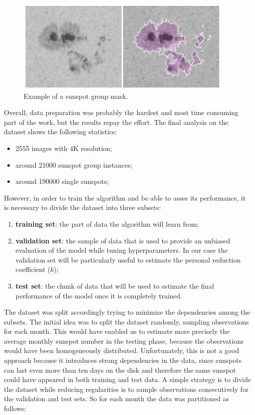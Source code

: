 \begin{figure}[t!]
    \centering
    \includegraphics[width=\textwidth]{./pictures/blanquish}
    \caption{Example of a sunspot group mask.}
    \label{fig:annotated-sunspot}
\end{figure}
Overall, data preparation was probably the hardest and most time consuming part of the work, but the results repay the effort. The final analysis on the dataset shows the following statistics:
\begin{itemize}
  \item 2555 images with 4K resolution;
  \item around 21000 sunspot group instances;
  \item around 190000 single sunspots;
\end{itemize}
However, in order to train the algorithm and be able to asses its performance, it is necessary to divide the dataset into three subsets:
\begin{enumerate}
  \item \textbf{training set}: the part of data the algorithm will learn from;
  \item \textbf{validation set}: the sample of data that is used to provide an unbiased evaluation of the model while tuning hyperparameters. In our case the validation set will be particularly useful to estimate the personal reduction coefficient ($k$);
  \item \textbf{test set}: the chunk of data that will be used to estimate the final performance of the model once it is completely trained.
\end{enumerate}
The dataset was split accordingly trying to minimize the dependencies among the subsets. The initial idea was to split the dataset randomly, sampling observations for each month. This would have enabled us to estimate more precisely the average monthly sunspot number in the testing phase, because the observations would have been homogeneously distributed. Unfortunately, this is not a good approach because it introduces strong dependencies in the data, since sunspots can last even more than ten days on the disk and therefore the same sunspot could have appeared in both training and test data. A simple strategy is to divide the dataset while reducing regularities is to sample observations consecutively for the validation and test sets. So for each month the data was partitioned as follows:
